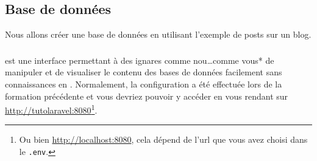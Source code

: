\subsection{Base de données}
Nous allons créer une base de données en utilisant l'exemple de posts sur un blog.


\subsubsection[PHPMyAdmin][]{\phpmyadmin{}}
\phpmyadmin{} est une interface permettant à des ignares comme nou\ldots comme vous* de manipuler et de visualiser le contenu des bases de données facilement sans connaissances en \mysql. Normalement, la configuration a été effectuée lors de la formation précédente et vous devriez pouvoir y accéder en vous rendant sur \url{http://tutolaravel:8080}\footnote{Ou bien \url{http://localhost:8080}, cela dépend de l'url que vous avez choisi dans le \texttt{.env}.}.

